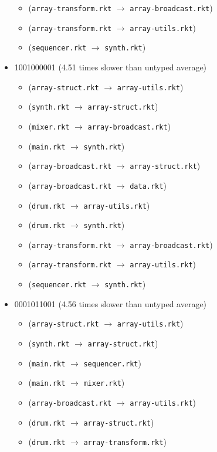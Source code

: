 \documentclass{article}
\newcommand{\mono}[1]{\texttt{#1}}
\begin{document}
\begin{itemize}
\begin{itemize}
  \item (\mono{array-transform.rkt} $\rightarrow$ \mono{array-broadcast.rkt})
  \item (\mono{array-transform.rkt} $\rightarrow$ \mono{array-utils.rkt})
  \item (\mono{sequencer.rkt} $\rightarrow$ \mono{synth.rkt})
  \end{itemize}
\item 1001000001 (4.51 times slower than untyped average)
  \begin{itemize}
  \item (\mono{array-struct.rkt} $\rightarrow$ \mono{array-utils.rkt})
  \item (\mono{synth.rkt} $\rightarrow$ \mono{array-struct.rkt})
  \item (\mono{mixer.rkt} $\rightarrow$ \mono{array-broadcast.rkt})
  \item (\mono{main.rkt} $\rightarrow$ \mono{synth.rkt})
  \item (\mono{array-broadcast.rkt} $\rightarrow$ \mono{array-struct.rkt})
  \item (\mono{array-broadcast.rkt} $\rightarrow$ \mono{data.rkt})
  \item (\mono{drum.rkt} $\rightarrow$ \mono{array-utils.rkt})
  \item (\mono{drum.rkt} $\rightarrow$ \mono{synth.rkt})
  \item (\mono{array-transform.rkt} $\rightarrow$ \mono{array-broadcast.rkt})
  \item (\mono{array-transform.rkt} $\rightarrow$ \mono{array-utils.rkt})
  \item (\mono{sequencer.rkt} $\rightarrow$ \mono{synth.rkt})
  \end{itemize}
\item 0001011001 (4.56 times slower than untyped average)
  \begin{itemize}
  \item (\mono{array-struct.rkt} $\rightarrow$ \mono{array-utils.rkt})
  \item (\mono{synth.rkt} $\rightarrow$ \mono{array-struct.rkt})
  \item (\mono{main.rkt} $\rightarrow$ \mono{sequencer.rkt})
  \item (\mono{main.rkt} $\rightarrow$ \mono{mixer.rkt})
  \item (\mono{array-broadcast.rkt} $\rightarrow$ \mono{array-utils.rkt})
  \item (\mono{drum.rkt} $\rightarrow$ \mono{array-struct.rkt})
  \item (\mono{drum.rkt} $\rightarrow$ \mono{array-transform.rkt})

\end{itemize}
\end{itemize}
\end{document}
